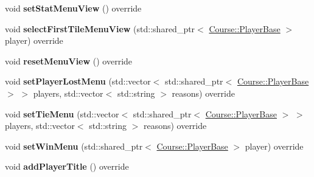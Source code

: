 \begin{DoxyCompactItemize}
\item 
\hypertarget{class_student_1_1_menu_object_manager_a8014cba2e47efc8d53ac08f74db8a017}{void {\bfseries set\-Stat\-Menu\-View} () override}\label{class_student_1_1_menu_object_manager_a8014cba2e47efc8d53ac08f74db8a017}

\item 
\hypertarget{class_student_1_1_menu_object_manager_a7ca89c96dc737675494a35dc196d484f}{void {\bfseries select\-First\-Tile\-Menu\-View} (std\-::shared\-\_\-ptr$<$ \hyperlink{class_course_1_1_player_base}{Course\-::\-Player\-Base} $>$ player) override}\label{class_student_1_1_menu_object_manager_a7ca89c96dc737675494a35dc196d484f}

\item 
\hypertarget{class_student_1_1_menu_object_manager_a52a7c380ffc5590ff21d160b9bea8857}{void {\bfseries reset\-Menu\-View} () override}\label{class_student_1_1_menu_object_manager_a52a7c380ffc5590ff21d160b9bea8857}

\item 
\hypertarget{class_student_1_1_menu_object_manager_acd75b14e7df410c3951110a43b7345c2}{void {\bfseries set\-Player\-Lost\-Menu} (std\-::vector$<$ std\-::shared\-\_\-ptr$<$ \hyperlink{class_course_1_1_player_base}{Course\-::\-Player\-Base} $>$ $>$ players, std\-::vector$<$ std\-::string $>$ reasons) override}\label{class_student_1_1_menu_object_manager_acd75b14e7df410c3951110a43b7345c2}

\item 
\hypertarget{class_student_1_1_menu_object_manager_a05ef309c94a5074efc7a180068c353d2}{void {\bfseries set\-Tie\-Menu} (std\-::vector$<$ std\-::shared\-\_\-ptr$<$ \hyperlink{class_course_1_1_player_base}{Course\-::\-Player\-Base} $>$ $>$ players, std\-::vector$<$ std\-::string $>$ reasons) override}\label{class_student_1_1_menu_object_manager_a05ef309c94a5074efc7a180068c353d2}

\item 
\hypertarget{class_student_1_1_menu_object_manager_a592527eb6d53addcaa8718865f526917}{void {\bfseries set\-Win\-Menu} (std\-::shared\-\_\-ptr$<$ \hyperlink{class_course_1_1_player_base}{Course\-::\-Player\-Base} $>$ player) override}\label{class_student_1_1_menu_object_manager_a592527eb6d53addcaa8718865f526917}

\item 
\hypertarget{class_student_1_1_menu_object_manager_a17d8c6f070ec204b7d9c842eff78d37f}{void {\bfseries add\-Player\-Title} () override}\label{class_student_1_1_menu_object_manager_a17d8c6f070ec204b7d9c842eff78d37f}


\end{DoxyCompactItemize}
